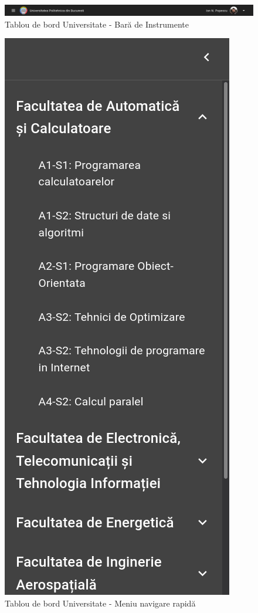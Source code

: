 \documentclass[12pt, a4paper, oneside, romanian]{teza-upb}
\begin{document}
\begin{figure}[H]
\centering
\includegraphics*[width=\columnwidth]{tablou-de-bord-universitate-bara-de-instrumente}
\caption{Tablou de bord Universitate - Bară de Instrumente}
\label{tablou-de-bord-universitate-bara-de-instrumente}
\end{figure}

\begin{figure}[H]
\centering
\includegraphics*[width=0.4\columnwidth]{tablou-de-bord-universitate-meniu-navigare-rapida}
\caption{Tablou de bord Universitate - Meniu navigare rapidă}
\label{tablou-de-bord-universitate-meniu-navigare-rapida}
\end{figure}
\end{document}
